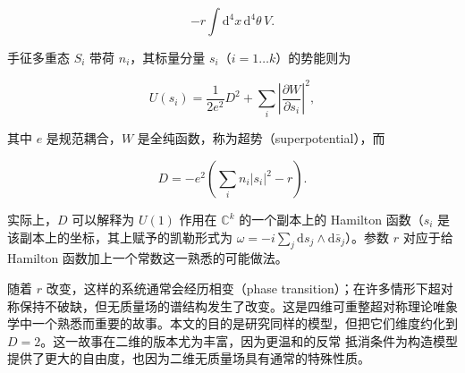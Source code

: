 \begin{equation}\tag{1.1}
  -r\int \mathrm{d}^4x\, \mathrm{d}^4\theta\, V.
\end{equation}

手征多重态 $S_i$ 带荷 $n_i$，其标量分量 $s_i$（$i=1\ldots k$）的势能则为

\begin{equation}\tag{1.2}
  U(s_i)=\frac{1}{2e^2}D^2+\sum_i\left|\frac{\partial W}{\partial s_i}\right|^2,
\end{equation}

其中 $e$ 是规范耦合，$W$ 是全纯函数，称为超势（superpotential），而

\begin{equation}\tag{1.3}
  D=-e^2\left(\sum_i n_i|s_i|^2-r\right).
\end{equation}

实际上，$D$ 可以解释为 $U(1)$ 作用在 $\mathbb{C}^k$ 的一个副本上的 Hamilton 函数（$s_i$ 是该副本上的坐标，其上赋予的凯勒形式为 $\omega=-i\sum_j \mathrm{d}s_j\wedge \mathrm{d}\bar s_j$）。参数 $r$ 对应于给 Hamilton 函数加上一个常数这一熟悉的可能做法。



随着 $r$ 改变，这样的系统通常会经历相变（phase transition）；在许多情形下超对称保持不破缺，但无质量场的谱结构发生了改变。这是四维可重整超对称理论唯象学中一个熟悉而重要的故事。本文的目的是研究同样的模型，但把它们维度约化到 $D=2$。这一故事在二维的版本尤为丰富，因为更温和的反常%
\label{op:3}
抵消条件为构造模型提供了更大的自由度，也因为二维无质量场具有通常的特殊性质。

